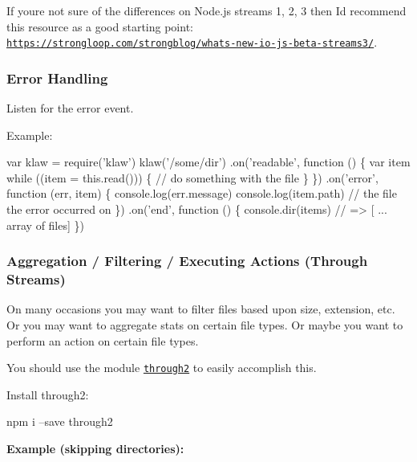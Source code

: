 If you\textquotesingle{}re not sure of the differences on Node.\+js streams 1, 2, 3 then I\textquotesingle{}d recommend this resource as a good starting point\+: \href{https://strongloop.com/strongblog/whats-new-io-js-beta-streams3/}{\tt https\+://strongloop.\+com/strongblog/whats-\/new-\/io-\/js-\/beta-\/streams3/}.

\subsubsection*{Error Handling}

Listen for the {\ttfamily error} event.

Example\+:


\begin{DoxyCode}
var klaw = require('klaw')
klaw('/some/dir')
  .on('readable', function () \{
    var item
    while ((item = this.read())) \{
      // do something with the file
    \}
  \})
  .on('error', function (err, item) \{
    console.log(err.message)
    console.log(item.path) // the file the error occurred on
  \})
  .on('end', function () \{
    console.dir(items) // => [ ... array of files]
  \})
\end{DoxyCode}


\subsubsection*{Aggregation / Filtering / Executing Actions (Through Streams)}

On many occasions you may want to filter files based upon size, extension, etc. Or you may want to aggregate stats on certain file types. Or maybe you want to perform an action on certain file types.

You should use the module \href{https://www.npmjs.com/package/through2}{\tt {\ttfamily through2}} to easily accomplish this.

Install {\ttfamily through2}\+: \begin{DoxyVerb}npm i --save through2
\end{DoxyVerb}


{\bfseries Example (skipping directories)\+:}



